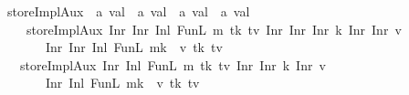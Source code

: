 \documentclass[11pt]{article}
\begin{document}
\begin{isabellebody}
\isanewline
{}\isamarkupfalse%
\ storeImplAux\ {\isacharcolon}{\kern0pt}{\isacharcolon}{\kern0pt}\ {\isachardoublequoteopen}{\isacharprime}{\kern0pt}a\ val{}{}{}{}\ {\isasymRightarrow}\ {\isacharprime}{\kern0pt}a\ val{}{}{}{}\ {\isasymRightarrow}\ {\isacharprime}{\kern0pt}a\ val{}{}{}{}\ {\isasymRightarrow}\ {\isacharprime}{\kern0pt}a\ val{}{}{}{}{\isachardoublequoteclose}\ \isanewline
\ \ \ \ {\isachardoublequoteopen}storeImplAux\ {\isacharparenleft}{\kern0pt}Inr\ {\isacharparenleft}{\kern0pt}Inr\ {\isacharparenleft}{\kern0pt}Inl\ {\isacharparenleft}{\kern0pt}FunL\ m\ tk\ tv{\isacharparenright}{\kern0pt}{\isacharparenright}{\kern0pt}{\isacharparenright}{\kern0pt}{\isacharparenright}{\kern0pt}\ {\isacharparenleft}{\kern0pt}Inr\ {\isacharparenleft}{\kern0pt}Inr\ {\isacharparenleft}{\kern0pt}Inr\ k{\isacharparenright}{\kern0pt}{\isacharparenright}{\kern0pt}{\isacharparenright}{\kern0pt}\ {\isacharparenleft}{\kern0pt}Inr\ {\isacharparenleft}{\kern0pt}Inr\ v{\isacharparenright}{\kern0pt}{\isacharparenright}{\kern0pt}\isanewline
\ \ \ \ \ \ {\isacharequal}{\kern0pt}\ {\isacharparenleft}{\kern0pt}Inr\ {\isacharparenleft}{\kern0pt}Inr\ {\isacharparenleft}{\kern0pt}Inl\ {\isacharparenleft}{\kern0pt}FunL\ {\isacharparenleft}{\kern0pt}m{\isacharparenleft}{\kern0pt}k\ {\isacharcolon}{\kern0pt}{\isacharequal}{\kern0pt}\ v{\isacharparenright}{\kern0pt}{\isacharparenright}{\kern0pt}\ tk\ tv{\isacharparenright}{\kern0pt}{\isacharparenright}{\kern0pt}{\isacharparenright}{\kern0pt}{\isacharparenright}{\kern0pt}{\isachardoublequoteclose}\isanewline
\ \ {\isacharbar}{\kern0pt}\ {\isachardoublequoteopen}storeImplAux\ {\isacharparenleft}{\kern0pt}Inr\ {\isacharparenleft}{\kern0pt}Inl\ {\isacharparenleft}{\kern0pt}FunL\ m\ tk\ tv{\isacharparenright}{\kern0pt}{\isacharparenright}{\kern0pt}{\isacharparenright}{\kern0pt}\ {\isacharparenleft}{\kern0pt}Inr\ {\isacharparenleft}{\kern0pt}Inr\ k{\isacharparenright}{\kern0pt}{\isacharparenright}{\kern0pt}\ {\isacharparenleft}{\kern0pt}Inr\ v{\isacharparenright}{\kern0pt}\isanewline
\ \ \ \ \ \ {\isacharequal}{\kern0pt}\ {\isacharparenleft}{\kern0pt}Inr\ {\isacharparenleft}{\kern0pt}Inl\ {\isacharparenleft}{\kern0pt}FunL\ {\isacharparenleft}{\kern0pt}m{\isacharparenleft}{\kern0pt}k\ {\isacharcolon}{\kern0pt}{\isacharequal}{\kern0pt}\ v{\isacharparenright}{\kern0pt}{\isacharparenright}{\kern0pt}\ tk\ tv{\isacharparenright}{\kern0pt}{\isacharparenright}{\kern0pt}{\isacharparenright}{\kern0pt}{\isachardoublequoteclose}\isanewline

\end{isabellebody}
\end{document}
